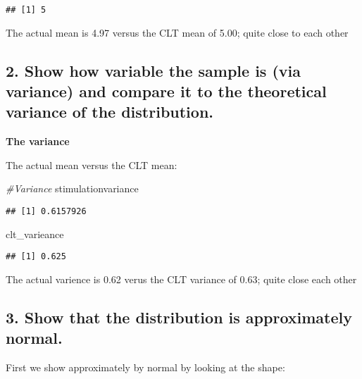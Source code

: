 \documentclass[
]{article}
\newenvironment{Shaded}{\begin{snugshade}}{\end{snugshade}}
\newcommand{\CommentTok}[1]{\textcolor[rgb]{0.56,0.35,0.01}{\textit{#1}}}
\newcommand{\NormalTok}[1]{#1}
\begin{document}
\begin{verbatim}
## [1] 5
\end{verbatim}

The actual mean is 4.97 versus the CLT mean of 5.00; quite close to each
other

\hypertarget{show-how-variable-the-sample-is-via-variance-and-compare-it-to-the-theoretical-variance-of-the-distribution.}{%
\subsection{2. Show how variable the sample is (via variance) and
compare it to the theoretical variance of the
distribution.}\label{show-how-variable-the-sample-is-via-variance-and-compare-it-to-the-theoretical-variance-of-the-distribution.}}

\textbf{The variance}

The actual mean versus the CLT mean:

\begin{Shaded}
\begin{Highlighting}[]
\CommentTok{#Variance}
\NormalTok{stimulationvariance}
\end{Highlighting}
\end{Shaded}

\begin{verbatim}
## [1] 0.6157926
\end{verbatim}

\begin{Shaded}
\begin{Highlighting}[]
\NormalTok{clt_varieance}
\end{Highlighting}
\end{Shaded}

\begin{verbatim}
## [1] 0.625
\end{verbatim}

The actual varience is 0.62 verus the CLT variance of 0.63; quite close
each other

\hypertarget{show-that-the-distribution-is-approximately-normal.}{%
\subsection{3. Show that the distribution is approximately
normal.}\label{show-that-the-distribution-is-approximately-normal.}}

First we show approximately by normal by looking at the shape:
\end{document}
